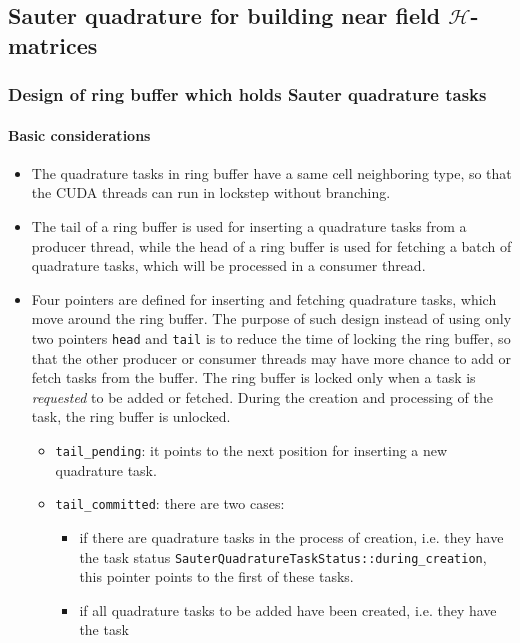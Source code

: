 \documentclass[11pt, a4paper]{article}
\begin{document}
\subsection{Sauter quadrature for building near field $\mathcal{H}$-matrices}

\subsubsection{Design of ring buffer which holds Sauter quadrature tasks}

\paragraph{Basic considerations}

\begin{itemize}
\item The quadrature tasks in ring buffer have a same cell neighboring type, so that the
  CUDA threads can run in lockstep without branching.
\item The tail of a ring buffer is used for inserting a quadrature tasks from a producer
  thread, while the head of a ring buffer is used for fetching a batch of quadrature
  tasks, which will be processed in a consumer thread.
\item Four pointers are defined for inserting and fetching quadrature tasks, which move
  around the ring buffer. The purpose of such design instead of using only two pointers
  \texttt{head} and \texttt{tail} is to reduce the time of locking the ring buffer, so
  that the other producer or consumer threads may have more chance to add or fetch tasks
  from the buffer. The ring buffer is locked only when a task is \emph{requested} to be
  added or fetched. During the creation and processing of the task, the ring buffer is
  unlocked.
  \begin{itemize}
  \item \texttt{tail\_pending}: it points to the next position for inserting a new
    quadrature task.
  \item \texttt{tail\_committed}: there are two cases:
    \begin{itemize}
    \item if there are quadrature tasks in the process of creation, i.e. they have the
      task status \texttt{SauterQuadratureTaskStatus::during\_creation}, this pointer
      points to the first of these tasks.
    \item if all quadrature tasks to be added have been created, i.e. they have the task

\end{itemize}
\end{itemize}
\end{itemize}
\end{document}
